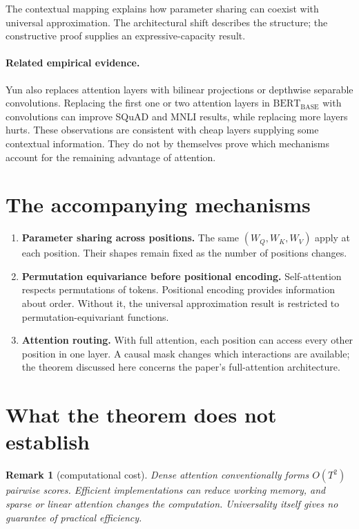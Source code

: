 \documentclass[11pt]{article}
\newtheorem*{remark}{Remark}
\begin{document}
The contextual mapping explains how parameter sharing can coexist
with universal approximation. The architectural shift describes the
structure; the constructive proof supplies an expressive-capacity result.

\paragraph{Related empirical evidence.}
Yun also replaces attention layers with bilinear projections or
depthwise separable convolutions. Replacing the first one or two
attention layers in $\text{BERT}_{\text{BASE}}$ with convolutions can
improve SQuAD and MNLI results, while replacing more layers hurts.
These observations are consistent with cheap layers supplying some
contextual information. They do not by themselves prove which
mechanisms account for the remaining advantage of attention.

\section{The accompanying mechanisms}

\begin{enumerate}
\item \textbf{Parameter sharing across positions.} The same
$(W_Q,W_K,W_V)$ apply at each position. Their shapes remain fixed as
the number of positions changes.

\item \textbf{Permutation equivariance before positional encoding.}
Self-attention respects permutations of tokens. Positional encoding
provides information about order. Without it, the universal
approximation result is restricted to permutation-equivariant functions.

\item \textbf{Attention routing.} With full attention, each position
can access every other position in one layer. A causal mask changes
which interactions are available; the theorem discussed here concerns
the paper's full-attention architecture.
\end{enumerate}

\section{What the theorem does not establish}

\begin{remark}[computational cost]
Dense attention conventionally forms $O(T^2)$ pairwise scores.
Efficient implementations can reduce working memory, and sparse or
linear attention changes the computation. Universality itself gives
no guarantee of practical efficiency.
\end{remark}
\end{document}
